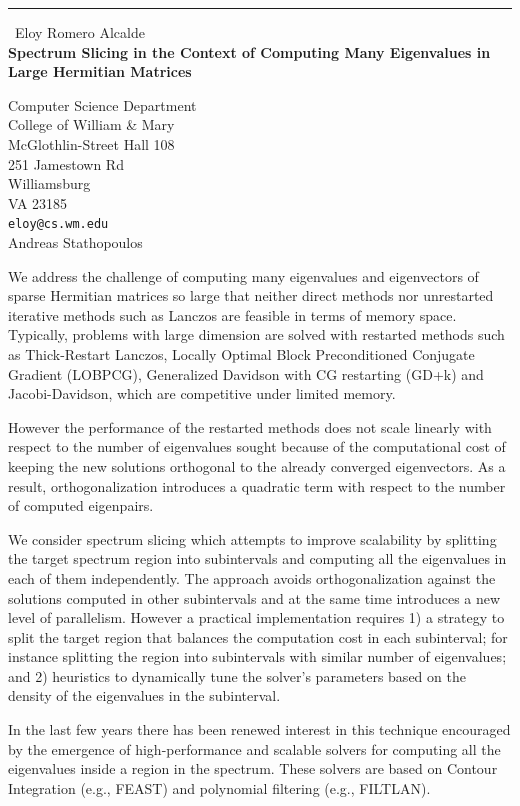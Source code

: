 \documentclass{report}
\begin{document}
\begin{center}
\rule{6in}{1pt} \
{\large Eloy Romero Alcalde \\
{\bf Spectrum Slicing in the Context of Computing Many Eigenvalues in Large Hermitian Matrices}}

Computer Science Department \\ College of William \& Mary \\ McGlothlin-Street Hall 108 \\ 251 Jamestown Rd \\ Williamsburg \\ VA 23185
\\
{\tt eloy@cs.wm.edu}\\
Andreas Stathopoulos\end{center}

We address the challenge of computing many eigenvalues and eigenvectors
of sparse Hermitian matrices so large that neither direct methods nor
unrestarted iterative methods such as Lanczos are feasible in terms of
memory space. Typically, problems with large dimension are solved with
restarted methods such as Thick-Restart Lanczos, Locally Optimal Block
Preconditioned Conjugate Gradient (LOBPCG), Generalized Davidson with CG
restarting (GD+k) and Jacobi-Davidson, which are competitive under
limited memory.

However the performance of the restarted methods does not scale linearly
with respect to the number of eigenvalues sought because of the
computational cost of keeping the new solutions orthogonal to the already
converged eigenvectors. As a result, orthogonalization introduces a
quadratic term with respect to the number of computed eigenpairs.

We consider spectrum slicing which attempts to improve scalability by
splitting the target spectrum region into subintervals and computing all
the eigenvalues in each of them independently. The approach avoids
orthogonalization against the solutions computed in other subintervals
and at the same time introduces a new level of parallelism. However a
practical implementation requires 1) a strategy to split the target
region that balances the computation cost in each subinterval; for
instance splitting the region into subintervals with similar number of
eigenvalues; and 2) heuristics to dynamically tune the solver's
parameters based on the density of the eigenvalues in the subinterval.

In the last few years there has been renewed interest in this technique
encouraged by the emergence of high-performance and scalable solvers for
computing all the eigenvalues inside a region in the spectrum. These
solvers are based on Contour Integration (e.g., FEAST) and polynomial
filtering (e.g., FILTLAN).
\end{document}
